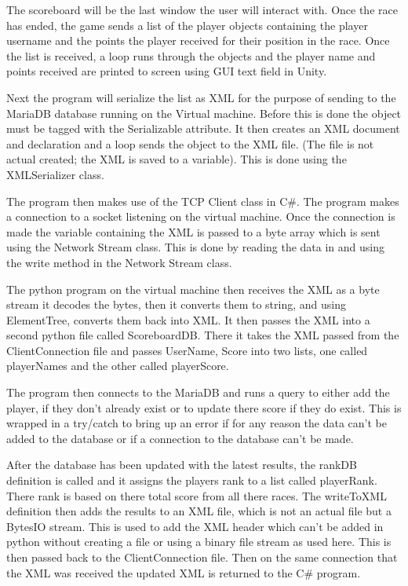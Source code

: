 \newline

The scoreboard will be the last window the user will interact with. Once the race has ended, the game sends a list of the player objects containing the player username and the points the player received for their position in the race. Once the list is received, a loop runs through the objects and the player name and points received are printed to screen using GUI text field in Unity.
\newline

Next the program will serialize the list as XML for the purpose of sending to the MariaDB database running on the Virtual machine. Before this is done the object must be tagged with the Serializable attribute. It then creates an XML document and declaration and a loop sends the object to the XML file. (The file is not actual created; the XML is saved to a variable). This is done using the XMLSerializer class.
\cite {93513120150101}

\newline

The program then makes use of the TCP Client class in C\#. The program makes a connection to a socket listening on the virtual machine. Once the connection is made the variable containing the XML is passed to a byte array which is sent using the Network Stream class. This is done by reading the data in and using the write method in the Network Stream class.
\cite {27494020090101}

\newline

The python program on the virtual machine then receives the XML as a byte stream it decodes the bytes, then it converts them to string, and using ElementTree, converts them back into XML. It then passes the XML into a second python file called ScoreboardDB. There it takes the XML passed from the ClientConnection file and passes UserName, Score into two lists, one called playerNames and the other called playerScore.
\newline

The program then connects to the MariaDB and runs a query to either add the player, if they don't already exist or to update there score if they do exist. This is wrapped in a try/catch to bring up an error if for any reason the data can't be added to the database or if a connection to the database can't be made.
\newline

After the database has been updated with the latest results, the rankDB definition is called and it assigns the players rank to a list called playerRank. There rank is based on there total score from all there races. The writeToXML definition then adds the results to an XML file, which is not an actual file but a BytesIO stream. This is used to add the XML header which can't be added in python without creating a file or using a binary file stream as used here. This is then passed back to the ClientConnection file. Then on the same connection that the XML was received the updated XML is returned to the C\# program.    
\newline

